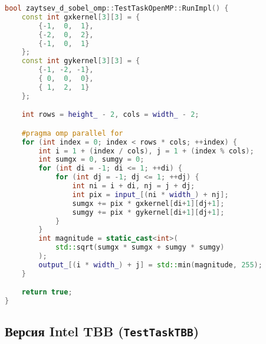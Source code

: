\documentclass[12pt]{article}
\begin{document}
\begin{lstlisting}[language=C++, caption={Параллельная реализация с OpenMP}]
bool zaytsev_d_sobel_omp::TestTaskOpenMP::RunImpl() {
    const int gxkernel[3][3] = {
        {-1,  0,  1},
        {-2,  0,  2},
        {-1,  0,  1}
    };
    const int gykernel[3][3] = {
        {-1, -2, -1},
        { 0,  0,  0},
        { 1,  2,  1}
    };

    int rows = height_ - 2, cols = width_ - 2;

    #pragma omp parallel for
    for (int index = 0; index < rows * cols; ++index) {
        int i = 1 + (index / cols), j = 1 + (index % cols);
        int sumgx = 0, sumgy = 0;
        for (int di = -1; di <= 1; ++di) {
            for (int dj = -1; dj <= 1; ++dj) {
                int ni = i + di, nj = j + dj;
                int pix = input_[(ni * width_) + nj];
                sumgx += pix * gxkernel[di+1][dj+1];
                sumgy += pix * gykernel[di+1][dj+1];
            }
        }
        int magnitude = static_cast<int>(
            std::sqrt(sumgx * sumgx + sumgy * sumgy)
        );
        output_[(i * width_) + j] = std::min(magnitude, 255);
    }

    return true;
}
\end{lstlisting}

\subsection{Версия Intel TBB (\texttt{TestTaskTBB})}
\end{document}
